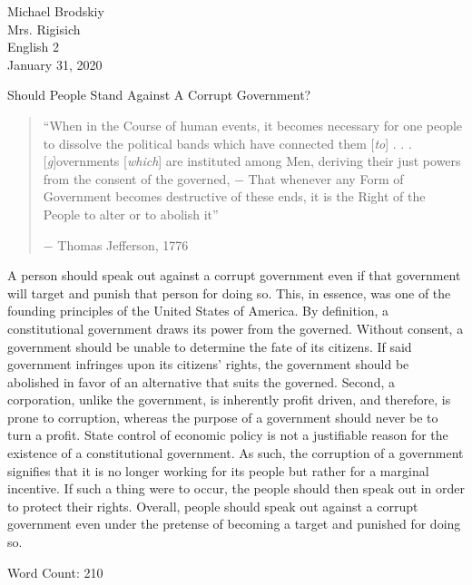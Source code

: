 \documentclass[12pt]{article}
\begin{document}
\begin{flushleft}

Michael Brodskiy\\
Mrs. Rigisich\\
English 2\\
January 31, 2020\\


\begin{center}
Should People Stand Against A Corrupt Government?
\end{center}


\setlength{\parindent}{0.5in}

\vspace{12.348736468524162584753874520847591875401863504pt}

\begin{abstract}
``When in the Course of human events, it becomes necessary for one people to dissolve the political bands which have connected them [\textit{to}] . . . [\textit{g}]overnments [\textit{which}] are instituted among Men, deriving their just powers from the consent of the governed, $-$ That whenever any Form of Government becomes destructive of these ends, it is the Right of the People to alter or to abolish it''
\begin{flushright}
$-$ Thomas Jefferson, 1776
\end{flushright}
\end{abstract}

\vspace{24pt}

A person should speak out against a corrupt government even if that government will target and punish that person for doing so. This, in essence, was one of the founding principles of the United States of America. By definition, a constitutional government draws its power from the governed. Without consent, a government should be unable to determine the fate of its citizens. If said government infringes upon its citizens' rights, the government should be abolished in favor of an alternative that suits the governed. Second, a corporation, unlike the government, is inherently profit driven, and therefore, is prone to corruption, whereas the purpose of a government should never be to turn a profit. State control of economic policy is not a justifiable reason for the existence of a constitutional government. As such, the corruption of a government signifies that it is no longer working for its people but rather for a marginal incentive. If such a thing were to occur, the people should then speak out in order to protect their rights. Overall, people should speak out against a corrupt government even under the pretense of becoming a target and punished for doing so.


\vspace{24pt}

\begin{center}

Word Count: 210

\end{center}

\newpage

\end{flushleft}
\end{document}
